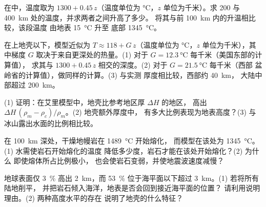 \begin{exercise}[$\star\star$]\label{exo:g11:lithosphere-asthenosphere:11}
在中，温度取为 $1300 + 0.45\,z$（温度单位为
\unit{\celsius}，$z$ 单位为千米）。求 200 与 \qty{400}{km} 处的温度，并求两者之间升高了多少。
将其与前 \qty{100}{km} 内的升温相比较，该段温度
由地表 \qty{15}{\celsius} 升至
底部 \qty{1345}{\celsius}。
\end{exercise}

\begin{exercise}[$\star\star\star$]\label{exo:g11:lithosphere-asthenosphere:12}
在上地壳以下，模型近似为 $T \approx 118 +
G\,z$（温度单位为 \unit{\celsius}，$z$ 单位为千米），其中梯度 $G$
取决于来自更深处的热量。(1) 对于 $G =
\qty{12.3}{\celsius}$ 每千米（美国东部的计算值），
求其与 $1300 + 0.45\,z$ 相交的深度。(2)
对于 $G = \qty{21.5}{\celsius}$ 每千米（西部
盆岭省的计算值），做同样的计算。(3) 与实测
厚度相比较，西部约 \qty{40}{km}，
大陆中部超过 \qty{200}{km}。
\end{exercise}

\begin{exercise}[$\star\star\star$]\label{exo:g11:lithosphere-asthenosphere:13}
(1) 证明：在艾里模型中，地壳比参考地区厚 $\Delta H$ 的地区，
高出 $\Delta H\,(\rho_m - \rho_c)/\rho_m$。(2) 地壳额外厚度中，
有多大比例表现为地表高度？(3) 与
冰山露出水面的比例相比较。
\end{exercise}

\begin{exercise}[$\star\star\star$]\label{exo:g11:lithosphere-asthenosphere:14}
在 \qty{100}{km} 深处，干燥地幔岩在 \qty{1489}{\celsius} 开始熔化，
而模型在该处为 \qty{1345}{\celsius}。(1) 水需使岩石开始熔化的温度
降低多少度，岩石才能在该处开始熔化？(2) 为什么
即使熔体所占比例极小，
也会使岩石变弱，并使地震波速度减慢？
\end{exercise}

\begin{exercise}[$\star\star\star$]\label{exo:g11:lithosphere-asthenosphere:15}
地球表面仅 \qty{3}{\percent} 高出 \qty{2}{km}，而
\qty{53}{\percent} 位于海平面以下超过 \qty{3}{km}。(1) 若将所有陆地削平，
并把岩石倾入海洋，地表是否会回到接近海平面的位置？
请利用说明理由。(2) 两种高度水平的存在
说明了地壳的什么特征？
\end{exercise}

